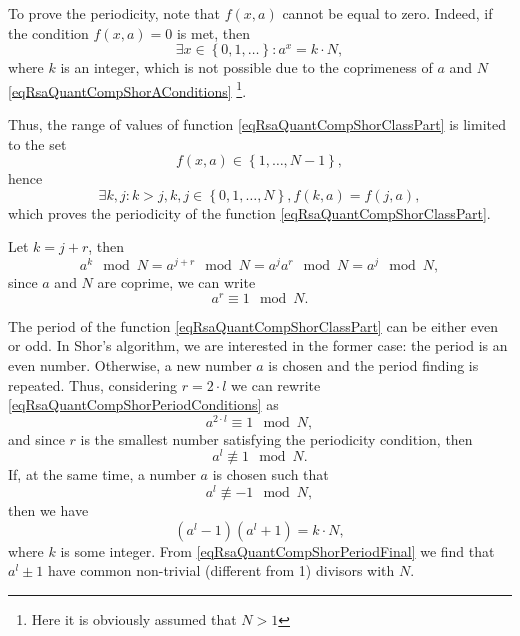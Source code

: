 To prove the periodicity, note that $f\left(x, a\right)$ cannot
be equal to zero. Indeed, if the condition
$f\left(x, a\right) = 0$ is met, then 
\[
\exists x \in \left\{0, 1, \dots\right\}:
a^x = k \cdot N,
\]
where $k$ is an integer, which is not possible due to
the coprimeness of $a$ and $N$ \eqref{eqRsaQuantCompShorAConditions}
\footnote{Here it is obviously assumed that $N > 1$}.

Thus, the range of values of function
\eqref{eqRsaQuantCompShorClassPart} is limited to the set 
\begin{equation}
f\left(x,
a\right) \in \left\{1, \dots, N - 1\right\},
\nonumber
\end{equation}
hence 
\begin{equation}
\exists k,j: k > j, k,j \in \left\{0, 1, \dots, N\right\},
f\left(k,a\right) = f\left(j,a\right),
\nonumber
\end{equation}
which proves the periodicity of the function \eqref{eqRsaQuantCompShorClassPart}.

Let $k = j + r$, then
\[
a^k \mod{N} = a^{j + r} \mod{N} = a^j a^r \mod{N}= a^j \mod{N},
\]
since $a$ and $N$ are coprime, we can write
\begin{equation}
a^r \equiv 1 \mod{N}.
\label{eqRsaQuantCompShorPeriodConditions}
\end{equation}


The period of the function \eqref{eqRsaQuantCompShorClassPart} can be either
even or odd. In Shor's algorithm, we are interested in the former case:
the period is an even number. Otherwise, a new number $a$ is chosen and the period finding is repeated. Thus, considering $r= 2\cdot l$ we
can rewrite \eqref{eqRsaQuantCompShorPeriodConditions} as
\begin{equation}
a^{2 \cdot l} \equiv 1 \mod{N},
\nonumber
\end{equation}
and since $r$ is the smallest number satisfying the periodicity condition, then
\[
a^{l} \not\equiv 1 \mod{N}.
\]
If, at the same time, a number $a$ is chosen such that 
\[
a^{l} \not\equiv -1 \mod{N},
\]
then we have 
\begin{equation}
\left(a^l - 1\right)\left(a^l + 1\right) = k \cdot N,
\label{eqRsaQuantCompShorPeriodFinal}
\end{equation}
where $k$ is some integer. From
\eqref{eqRsaQuantCompShorPeriodFinal} we find that $a^l \pm 1$ have
common non-trivial (different from 1) divisors with $N$.

